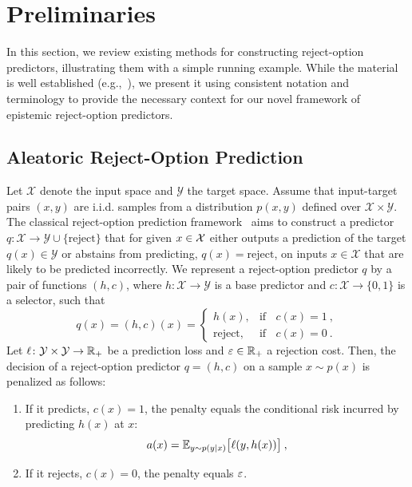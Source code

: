 \section{Preliminaries}

In this section, we review existing methods for constructing reject-option predictors, illustrating them with a simple running example. 
While the material is well established (e.g.,~\cite{Bishop-PRML-2006}), we present it using consistent notation and terminology to provide the necessary context for our novel framework of epistemic reject-option predictors.%

\subsection{Aleatoric Reject-Option Prediction}
\label{sec:AleatorRejectOption}

Let $\mathcal{X}$ denote the input space and $\mathcal{Y}$ the target space. Assume that input-target pairs $(x,y)$ are i.i.d. samples from a distribution $p(x,y)$ defined over $\mathcal{X}\times\mathcal{Y}$.
The classical reject-option prediction framework~\cite{Chow-RejectOpt-TIT1970} aims to construct a predictor
$q\colon \mathcal{X}\to \mathcal{Y}\cup\{\text{reject}\}$
that for given $x\in{\cal X}$ either outputs a prediction of the target $q(x)\in\mathcal{Y}$ or abstains from predicting, $q(x)=\text{reject}$, on inputs $x\in\mathcal{X}$ that are likely to be predicted incorrectly.
We represent a reject-option predictor $q$ by a pair of functions $(h,c)$, where
$h\colon \mathcal{X}\to\mathcal{Y}$ is a base predictor and
$c\colon \mathcal{X}\to\{0,1\}$ is a selector, such that
\[
   q(x) = (h,c)(x) =
   \begin{cases}
     h(x), & \text{if }\;\; c(x)=1 \:,\\
     \text{reject}, & \text{if }\;\; c(x)=0 \:.
   \end{cases}
\]
%
Let $\ell\colon{\cal Y}\times{\cal Y}\rightarrow\mathbb{R}_+$ be a prediction loss and $\varepsilon\in\mathbb{R}_+$ a rejection cost. Then, the decision of a reject-option predictor $q=(h,c)$ on a sample $x\sim p(x)$ is penalized as follows:
\begin{enumerate}
    \item If it predicts, $c(x)=1$, the penalty equals the conditional risk incurred by predicting $h(x)$ at $x$:
  \[
    a(x) = {\mathbb{E}}_{y\sim p(y|x)}\big [ \ell(y,h(x)) \big ]\:,
  \]
\item If it rejects, $c(x)=0$, the penalty equals $\varepsilon$.
\end{enumerate}

